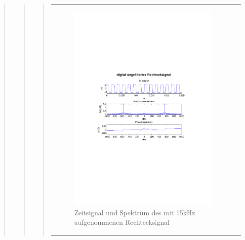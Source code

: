 \begin{quote}
\begin{quote}
\begin{quote}
\begin{center}
\begin{tabular}{ll}
\begin{minipage}{0.6\textwidth}
                        \begin{figure}[H]
                            \label{fig:}
                            \includegraphics[scale=0.5, trim = 1.5cm 7cm 1.5cm 8.5cm,
                            clip]{./Bilder/rechteck15kHz_normal}
                            \caption{Zeitsignal und Spektrum des
                            mit 15kHz aufgenommenen Rechtecksignal}
                        \end{figure}
    
                    \end{minipage}
                    \begin{minipage}{0.6\textwidth}
    

\end{minipage}
\end{tabular}
\end{center}
\end{quote}
\end{quote}
\end{quote}
